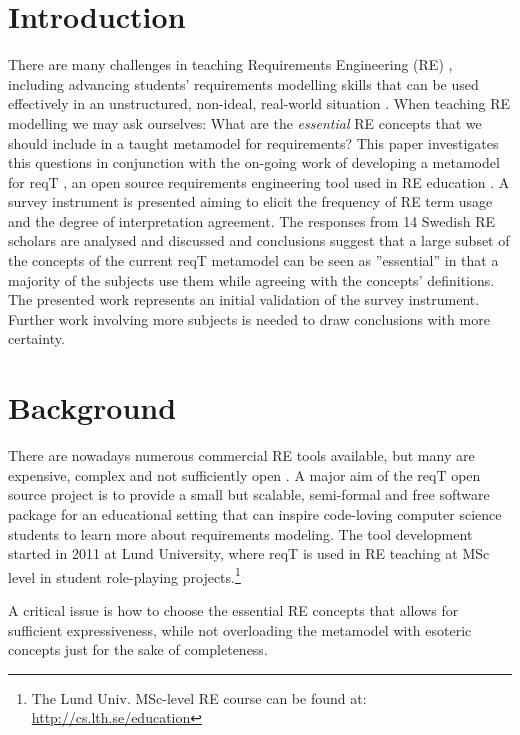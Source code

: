 \documentclass[a4paper]{llncs}
\begin{document}
\section{Introduction}
There are many challenges in teaching Requirements Engineering (RE) \cite{Memon2010, Regev2011}, including  advancing students' requirements modelling skills that can be used effectively in an unstructured, non-ideal, real-world situation \cite{Callele2006}. When teaching RE modelling we may ask ourselves: What are the \textit{essential} RE concepts that we should include in a taught metamodel for requirements? This paper investigates this questions in conjunction with the on-going work of developing a metamodel for reqT \cite{reqT}, an open source requirements engineering tool used in RE education  \cite{Regnell2013}.
A survey instrument is presented aiming to elicit the frequency of RE term usage and the degree of interpretation agreement. The responses from 14 Swedish RE scholars are analysed and discussed and conclusions suggest that a large subset of the concepts of the current reqT metamodel can be seen as ''essential'' in that a majority of the subjects use them while agreeing with the concepts' definitions. The presented work represents an initial validation of the survey instrument. Further work involving more subjects is needed to draw conclusions with more certainty. 

\section{Background}

There are nowadays numerous commercial RE tools available, but many are expensive, complex and not sufficiently open  \cite{Carillo2011}. A major aim of the reqT open source project is to provide a small but scalable, semi-formal and free software package for an educational setting \cite{Regnell2013} that can inspire code-loving computer science students to learn more about requirements modeling. The tool development started in 2011 at Lund University, where reqT is used in RE teaching at MSc level in student role-playing projects.\footnote{\label{note:ets170}The Lund Univ. MSc-level RE course can be found at: \scriptsize\url{http://cs.lth.se/education}}

A critical issue is how to choose the essential RE concepts that allows for sufficient expressiveness, while not overloading the metamodel with esoteric concepts just for the sake of completeness. 
\end{document}
